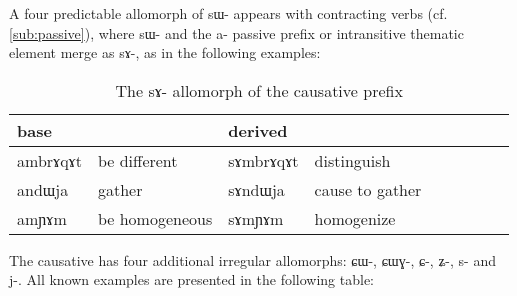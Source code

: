 \documentclass[oldfontcommands,oneside,a4paper,11pt]{memoir}
\newcommand{\ipa}[1]{{\phon #1}} %
\begin{document}
A four predictable allomorph of \ipa{sɯ-} appears with contracting verbs (cf. \ref{sub:passive}), where \ipa{sɯ-}  and the \ipa{a-} passive prefix or intransitive thematic element merge as \ipa{sɤ-}, as in the following examples:
\begin{table}[H]
\caption{The \ipa{sɤ}-   allomorph  of the causative prefix}\label{tab:causative.sA}
\begin{tabular}{lllllllll} \toprule
  base & & derived & \\
 \midrule
 \ipa{ambrɤqɤt} & be different & \ipa{sɤmbrɤqɤt} & distinguish \\
\ipa{andɯja} & gather & \ipa{sɤndɯja} & cause to gather \\
 \ipa{amɲɤm} & be homogeneous & \ipa{sɤmɲɤm} & homogenize \\
 \bottomrule
\end{tabular}
\end{table}

The causative has four additional irregular allomorphs: \ipa{ɕɯ-}, \ipa{ɕɯɣ-}, \ipa{ɕ-}, \ipa{ʑ-}, \ipa{s-} and \ipa{j-}. All known examples are presented in the following table:
\end{document}
